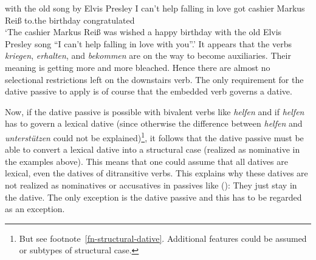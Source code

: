      with the old song   by  Elvis Presley \hphantom{"`}I can't help falling in love got cashier Markus Reiß to.the birthday congratulated\\
\glt `The cashier Markus Reiß was wished a happy birthday with the old Elvis Presley song ``I can't help falling in love with you''.'
\zl
It appears that the verbs \emph{kriegen}, \emph{erhalten}, and \emph{bekommen} are on the way to become
auxiliaries. Their meaning is getting more and more bleached. Hence there are almost no selectional
restrictions left on the downstairs verb. The only requirement for the dative passive to apply is of
course that the embedded verb governs a dative.

Now, if the dative passive is possible with bivalent verbs like \emph{helfen} and if \emph{helfen}
has to govern a lexical dative (since otherwise the difference between \emph{helfen} and
\emph{unterstützen} could not be explained)\footnote{%
  But see footnote~\ref{fn-structural-dative}. Additional features could be assumed or subtypes of
  structural case.}, 
it follows that the dative passive must be able to
convert a lexical dative into a structural case (realized as nominative in the examples above). This
means that one could assume that all datives are lexical, even the datives of ditransitive
verbs. This explains why these datives are not realized as nominatives or accusatives in passives
like ():
\eal
{}
\zl
They just stay in the dative. The only exception is the dative passive and this has to be regarded as an exception.





